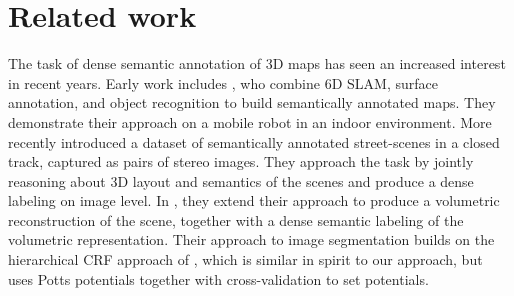 \section{Related work}
The task of dense semantic annotation of 3D maps has seen an increased interest
in recent years.  Early work includes \citet{nuchter2008towards}, who combine
6D SLAM, surface annotation, and object recognition to build semantically
annotated maps. They demonstrate their approach on a mobile robot in an indoor
environment.
%
More recently \citet{sengupta2012automatic} introduced a dataset of
semantically annotated street-scenes in a closed track, captured as pairs of
stereo images. They approach the task by jointly reasoning about 3D layout and
semantics of the scenes and produce a dense labeling on image level.  In
\citet{senguptaurban}, they extend their approach to produce a volumetric
reconstruction of the scene, together with a dense semantic labeling of the
volumetric representation. Their approach to image segmentation builds on
the hierarchical CRF approach of
\citet{ladicky2009associative}, which is similar in spirit to our approach,
but uses Potts potentials together with cross-validation to set potentials.

